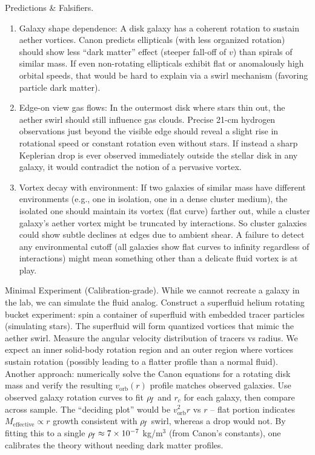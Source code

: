 \documentclass[11pt]{article}
\begin{document}
Predictions & Falsifiers.


\begin{enumerate}

\item 
Galaxy shape dependence: A disk galaxy has a coherent rotation to sustain aether vortices. Canon predicts ellipticals (with less organized rotation) should show less “dark matter” effect (steeper fall-off of $v$) than spirals of similar mass. If even non-rotating ellipticals exhibit flat or anomalously high orbital speeds, that would be hard to explain via a swirl mechanism (favoring particle dark matter).




\item 
Edge-on view gas flows: In the outermost disk where stars thin out, the aether swirl should still influence gas clouds. Precise 21-cm hydrogen observations just beyond the visible edge should reveal a slight rise in rotational speed or constant rotation even without stars. If instead a sharp Keplerian drop is ever observed immediately outside the stellar disk in any galaxy, it would contradict the notion of a pervasive vortex.




\item 
Vortex decay with environment: If two galaxies of similar mass have different environments (e.g., one in isolation, one in a dense cluster medium), the isolated one should maintain its vortex (flat curve) farther out, while a cluster galaxy’s aether vortex might be truncated by interactions. So cluster galaxies could show subtle declines at edges due to ambient shear. A failure to detect any environmental cutoff (all galaxies show flat curves to infinity regardless of interactions) might mean something other than a delicate fluid vortex is at play.




\end{enumerate}

Minimal Experiment (Calibration-grade). While we cannot recreate a galaxy in the lab, we can simulate the fluid analog. Construct a superfluid helium rotating bucket experiment: spin a container of superfluid with embedded tracer particles (simulating stars). The superfluid will form quantized vortices that mimic the aether swirl. Measure the angular velocity distribution of tracers vs radius. We expect an inner solid-body rotation region and an outer region where vortices sustain rotation (possibly leading to a flatter profile than a normal fluid). Another approach: numerically solve the Canon equations for a rotating disk mass and verify the resulting $v_{\text{orb}}(r)$ profile matches observed galaxies. Use observed galaxy rotation curves to fit $\rho_{\!f}$ and $r_c$ for each galaxy, then compare across sample. The “deciding plot” would be $v_{\text{orb}}^2 r$ vs $r$ – flat portion indicates $M_{\text{effective}} \propto r$ growth consistent with $\rho_{\!f}$ swirl, whereas a drop would not. By fitting this to a single $\rho_{\!f} \approx 7\times10^{-7}$ kg/m$^3$ (from Canon’s constants), one calibrates the theory without needing dark matter profiles.
\end{document}
